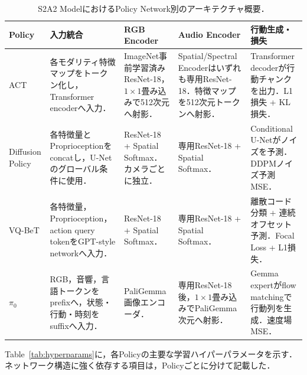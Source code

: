 \documentclass{article}
\begin{document}
\begin{table}[t]
\centering
\scriptsize
\setlength{\tabcolsep}{3pt}
\caption{S2A2 ModelにおけるPolicy Network別のアーキテクチャ概要．}
\label{tab:policy_architecture}
\begin{tabular}{p{} p{} p{} p{} p{}}
\hline
Policy & 入力統合 & RGB Encoder & Audio Encoder & 行動生成・損失 \\
\hline
ACT & 各モダリティ特徴マップをトークン化し，Transformer encoderへ入力． & ImageNet事前学習済みResNet-18，$1\times1$畳み込みで512次元へ射影． & Spatial/Spectral Encoderはいずれも専用ResNet-18．特徴マップを512次元トークンへ射影． & Transformer decoderが行動チャンクを出力．L1損失 + KL損失． \\
Diffusion Policy & 各特徴量とProprioceptionをconcatし，U-Netのグローバル条件に使用． & ResNet-18 + Spatial Softmax．カメラごとに独立． & 専用ResNet-18 + Spatial Softmax． & Conditional U-Netがノイズを予測．DDPMノイズ予測MSE． \\
VQ-BeT & 各特徴量，Proprioception，action query tokenをGPT-style networkへ入力． & ResNet-18 + Spatial Softmax． & 専用ResNet-18 + Spatial Softmax． & 離散コード分類 + 連続オフセット予測．Focal Loss + L1損失． \\
$\pi_0$ & RGB，音響，言語トークンをprefixへ，状態・行動・時刻をsuffixへ入力． & PaliGemma画像エンコーダ． & 専用ResNet-18後，$1\times1$畳み込みでPaliGemma次元へ射影． & Gemma expertがflow matchingで行動列を生成．速度場MSE． \\
\hline
\end{tabular}
\end{table}

Table~\ref{tab:hyperparams}に，各Policyの主要な学習ハイパーパラメータを示す．ネットワーク構造に強く依存する項目は，Policyごとに分けて記載した．
\end{document}
